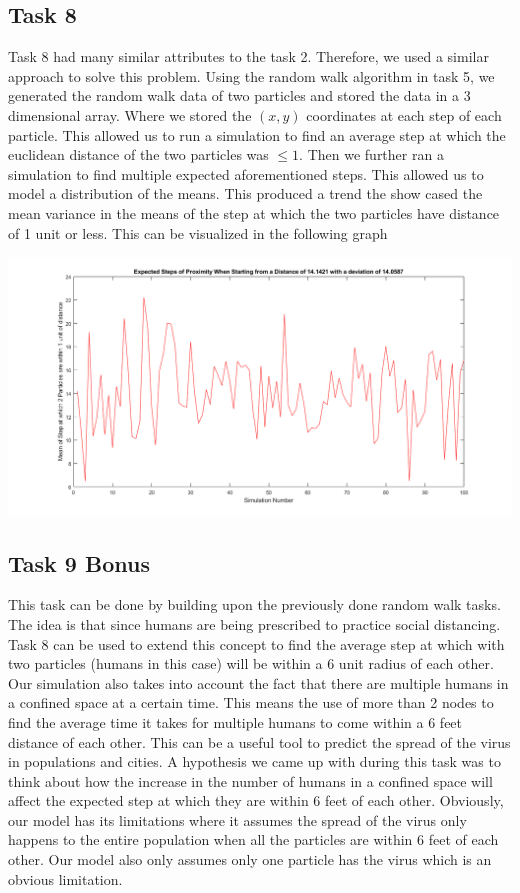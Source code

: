 \documentclass{article}
\begin{document}
\subsection{Task 8}
Task 8 had many similar attributes to the task 2. Therefore, we used a similar approach to solve this problem. Using the random walk algorithm in task 5, we generated the random walk data
of two particles and stored the data in a 3 dimensional array. Where we stored the $(x,y)$ coordinates at each step of each particle. This allowed us to run a simulation to find an average 
step at which the euclidean distance of the two particles was $\leq 1$. Then we further ran a simulation to find multiple expected aforementioned steps. This allowed us to model a distribution 
of the means. This produced a trend the show cased the mean variance in the means of the step at which the two particles have distance of 1 unit or less. This can be visualized in the following 
graph


\begin{center}
    \includegraphics[scale = 0.4]{Meandist.png}
\end{center}

\subsection{Task 9 Bonus}
This task can be done by building upon the previously done random walk tasks. The idea is that since humans are being prescribed to practice social distancing. Task 8 can be used to extend this concept to find the average step at which with two particles (humans in this case) will be within a 6 unit radius of each other. Our simulation also takes into account the fact that there are
multiple humans in a confined space at a certain time. This means the use of more than 2 nodes to find the average time it takes for multiple humans to come within  a 6 feet distance of each other. This can be a useful tool to predict the spread of the virus in populations and cities. 
A hypothesis we came up with during this task was to think about how the increase in the number of humans in a confined space will affect the expected step at which they are within 6 feet of each other. Obviously, our
model has its limitations where it assumes the spread of the virus only happens to the entire population when all the particles are within 6 feet of each other. Our model also only assumes only one particle has the virus which is an obvious limitation.
\end{document}
